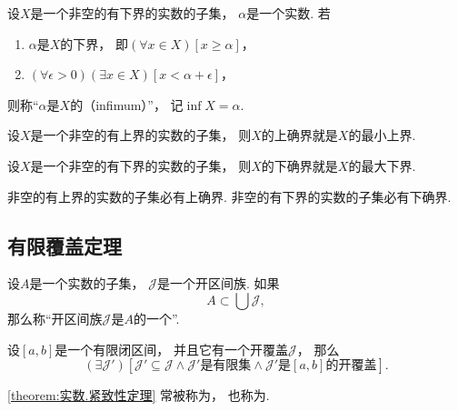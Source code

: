 \begin{definition}
设\(X\)是一个非空的有下界的实数的子集，
\(\alpha\)是一个实数.
若\begin{enumerate}
	\item \(\alpha\)是\(X\)的下界，
	即\((\forall x \in X)[x \geq \alpha]\)，

	\item \((\forall \epsilon>0)(\exists x \in X)[x<\alpha+\epsilon]\)，
\end{enumerate}
则称“\(\alpha\)是\(X\)的（infimum）”，
记\(\inf X = \alpha\).
\end{definition}

\begin{proposition}
设\(X\)是一个非空的有上界的实数的子集，
则\(X\)的上确界就是\(X\)的最小上界.
\end{proposition}

\begin{proposition}
设\(X\)是一个非空的有下界的实数的子集，
则\(X\)的下确界就是\(X\)的最大下界.
\end{proposition}


\begin{theorem}[确界原理]
非空的有上界的实数的子集必有上确界.
非空的有下界的实数的子集必有下确界.
\end{theorem}

\subsection{有限覆盖定理}
\begingroup
\def\J{\mathscr{J}}%
\begin{definition}
设\(A\)是一个实数的子集，
\(\J\)是一个开区间族.
如果\[
	A \subset \bigcup \J,
\]
那么称“开区间族\(\J\)是\(A\)的一个”.
\end{definition}

\begin{theorem}[紧致性定理]\label{theorem:实数.紧致性定理}
设\([a,b]\)是一个有限闭区间，
并且它有一个开覆盖\(\J\)，
那么\[
	(\exists \J')
	[
		\J' \subseteq \J
		\land
		\text{\(\J'\)是有限集}
		\land
		\text{\(\J'\)是\([a,b]\)的开覆盖}
	].
\]
\end{theorem}
\cref{theorem:实数.紧致性定理} 常被称为，
也称为.

\endgroup%
